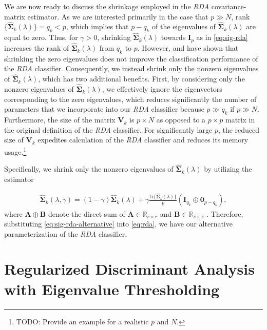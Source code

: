 \documentclass[11pt]{article}
\newcommand{\tr}{\text{tr}}
\begin{document}
We are now ready to discuss the shrinkage employed in the \emph{RDA} covariance-matrix estimator. As we are interested primarily in the case that $p \gg N$, rank$\{\widehat{\bm\Sigma}_k(\lambda)\} = q_k < p$, which implies that $p - q_k$ of the eigenvalues of $\widehat{\bm\Sigma}_k(\lambda)$ are equal to zero. Thus, for $\gamma > 0$, shrinking $\widehat{\bm\Sigma}_k(\lambda)$ towards $\bm I_p$ as in \eqref{eq:sig-rda} increases the rank of $\widehat{\bm\Sigma}_k(\lambda)$ from $q_k$ to $p$. However, \cite{Ye:2009gd} and \cite{YeOtherPaperCitedInTheFirst} have shown that shrinking the zero eigenvalues does not improve the classification performance of the \emph{RDA} classifier. Consequently, we instead shrink only the nonzero eigenvalues of $\widehat{\bm\Sigma}_k(\lambda)$, which has two additional benefits. First, by considering only the nonzero eigenvalues of $\widehat{\bm\Sigma}_k(\lambda)$, we effectively ignore the eigenvectors corresponding to the zero eigenvalues, which reduces significantly the number of parameters that we incorporate into our \emph{RDA} classifier because $p \gg q_k$ if $p \gg N$. Furthermore, the size of the matrix $\bm V_k$ is $p \times N$ as opposed to a $p \times p$ matrix in the original definition of the \emph{RDA} classifier. For significantly large $p$, the reduced size of $\bm V_k$ expedites calculation of the \emph{RDA} classifier and reduces its memory usage.\footnote{TODO: Provide an example for a realistic $p$ and $N$.}

Specifically, we shrink only the nonzero eigenvalues of $\widehat{\bm \Sigma}_k(\lambda)$ by utilizing the estimator

\begin{align}
	\widehat{\bm\Sigma}_k(\lambda, \gamma) = (1 - \gamma) \widehat{\bm\Sigma}_k(\lambda) + \gamma \frac{\tr\{\widehat{\bm\Sigma}_k(\lambda)\}}{p} (\bm I_{q_k} \oplus \bm 0_{p - q_k}),\label{eq:sig-rda-alternative}
\end{align}
where $\bm A \oplus \bm B$ denote the direct sum of $\bm A \in \mathbb{R}_{r \times r}$ and $\bm B \in \mathbb{R}_{s \times s}$ \citep[Chapter 1]{Lutkepohl:1996uz}. Therefore, substituting \eqref{eq:sig-rda-alternative} into \eqref{eq:rda}, we have our alternative parameterization of the \emph{RDA} classifier.


\section{Regularized Discriminant Analysis with Eigenvalue Thresholding}
\end{document}
